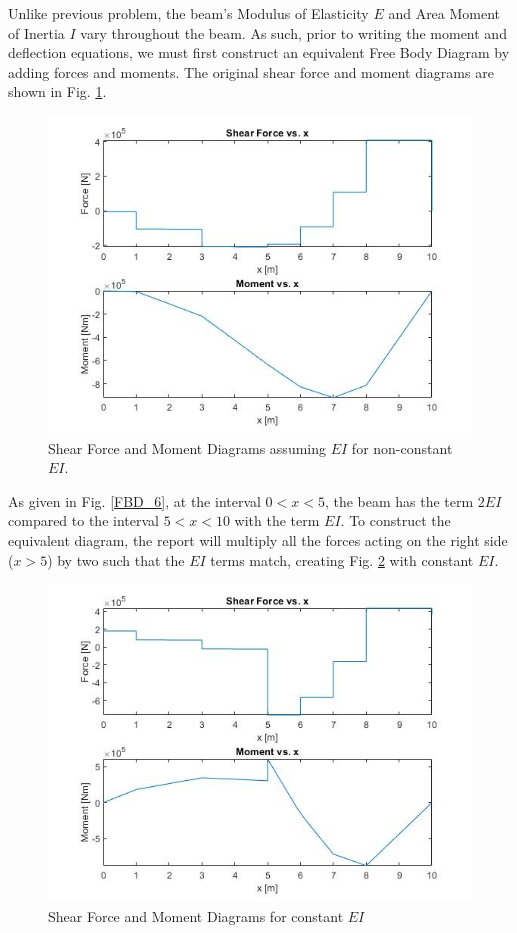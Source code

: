\documentclass[a4paper]{article}
\begin{document}
Unlike previous problem, the beam's Modulus of Elasticity $E$ and Area Moment of Inertia $I$ vary throughout the beam. As such, prior to writing the moment and deflection equations, we must first construct an equivalent Free Body Diagram by adding forces and moments. The original shear force and moment diagrams are shown in Fig. \ref{noneq6}.

\begin{figure}[h]
\includegraphics[width=\textwidth]{results/noneq6.jpg}
\caption{Shear Force and Moment Diagrams assuming $EI$ for non-constant $EI$.}
\label{noneq6}
\end{figure}

As given in Fig. \ref{FBD_6}, at the interval $0<x<5$, the beam has the term $2EI$ compared to the interval $5<x<10$ with the term $EI$. To construct the equivalent diagram, the report will multiply all the forces acting on the right side ($x>5$) by two such that the $EI$ terms match, creating Fig. \ref{eq6} with constant $EI$.

\begin{figure}[h]
\includegraphics[width=\textwidth]{results/eq6.jpg}
\caption{Shear Force and Moment Diagrams for constant $EI$}
\label{eq6}
\end{figure}
\end{document}
